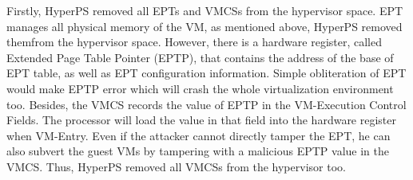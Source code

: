 Firstly, HyperPS removed all EPTs and VMCSs from the hypervisor space. EPT manages all physical memory of the VM, as mentioned above, HyperPS removed themfrom the hypervisor space. However, there is a hardware register, called Extended Page Table Pointer (EPTP), that contains the address of the base of EPT table, as well as EPT configuration information. Simple obliteration of EPT would make EPTP error which will crash the whole virtualization environment too. 
Besides, the VMCS records the value of EPTP in the VM-Execution Control Fields. The processor will load the value in that field into the hardware register when VM-Entry. 
Even if the attacker cannot directly tamper the EPT, he can also subvert the guest VMs by tampering with a malicious EPTP value in the VMCS. Thus, HyperPS removed all VMCSs from the hypervisor too. 


